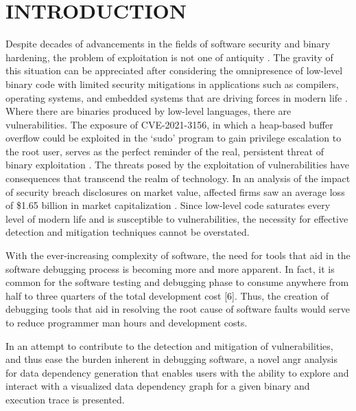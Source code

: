\chapter{INTRODUCTION}
Despite decades of advancements in the fields of software security and binary hardening, the problem of exploitation is not one of antiquity \citep{cowan1998stackguard, pappas2013transparent}. The gravity of this situation can be appreciated after considering the omnipresence of low-level binary code with limited security mitigations in applications such as compilers, operating systems, and embedded systems that are driving forces in modern life \citep{shoshitaishvili2016sok}. Where there are binaries produced by low-level languages, there are vulnerabilities. The exposure of CVE-2021-3156, in which a heap-based buffer overflow could be exploited in the ‘sudo’ program to gain privilege escalation to the root user, serves as the perfect reminder of the real, persistent threat of binary exploitation \citep{CVE-2021-3156}. The threats posed by the exploitation of vulnerabilities have consequences that transcend the realm of technology. In an analysis of the impact of security breach disclosures on market value, affected firms saw an average loss of \$1.65 billion in market capitalization \citep{cavusoglu2004effect}. Since low-level code saturates every level of modern life and is susceptible to vulnerabilities, the necessity for effective detection and mitigation techniques cannot be overstated.  

With the ever-increasing complexity of software, the need for tools that aid in the software debugging process is becoming more and more apparent. In fact, it is common for the software testing and debugging phase to consume anywhere from half to three quarters of the total development cost [6]. Thus, the creation of debugging tools that aid in resolving the root cause of software faults would serve to reduce programmer man hours and development costs. 

In an attempt to contribute to the detection and mitigation of vulnerabilities, and thus ease the burden inherent in debugging software, a novel angr analysis for data dependency generation that enables users with the ability to explore and interact with a visualized data dependency graph for a given binary and execution trace is presented. 